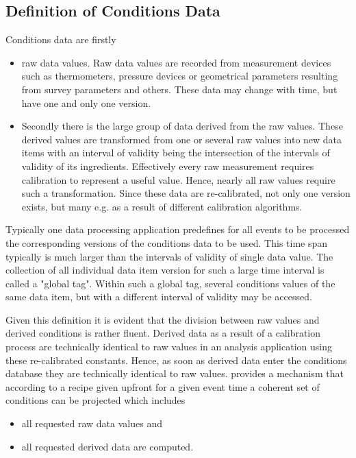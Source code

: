 \documentclass[10pt,a4paper]{article}
\begin{document}
\subsection{Definition of Conditions Data}
\label{subsec:ddcond-conditions-data}
\noindent
Conditions data are firstly
\begin{itemize}
\item raw data values. Raw data values are recorded from measurement 
      devices such as 
      thermometers, pressure devices or 
      geometrical parameters resulting
      from survey parameters and others.
      These data may change with time, but have one and only one version.
\item Secondly there is the large group of data derived from the raw values.
      These derived values are transformed from one or several raw values
      into new data items with an interval of validity being the
      intersection of the intervals of validity of its ingredients.
      Effectively every raw measurement requires calibration to represent
      a useful value. Hence, nearly all raw values require such a 
      transformation. Since these data are re-calibrated, not only one version
      exists, but many e.g. as a result of different calibration algorithms. 
\end{itemize}
Typically one data processing application predefines for all events 
to be processed the corresponding versions of the conditions data to be used.
This time span typically is much larger than the intervals of validity 
of single data value.
The collection of all individual data item version for such a large time interval
is called a "global tag".
Within such a global tag, several conditions values of the same data item, but 
with a different interval of validity may be accessed.

\noindent
Given this definition it is evident that the division between raw values 
and derived conditions is rather fluent. Derived data as a result of
a calibration process are technically identical to raw values in an
analysis application using these re-calibrated constants.
Hence, as soon as derived data enter the conditions database they are 
technically identical to raw values.
\DDC provides a mechanism that according to a recipe given upfront
for a given event time a coherent set of conditions can be projected
which includes
\begin{itemize}
\item all requested raw data values and
\item all requested derived data are computed.
\end{itemize}
\end{document}
